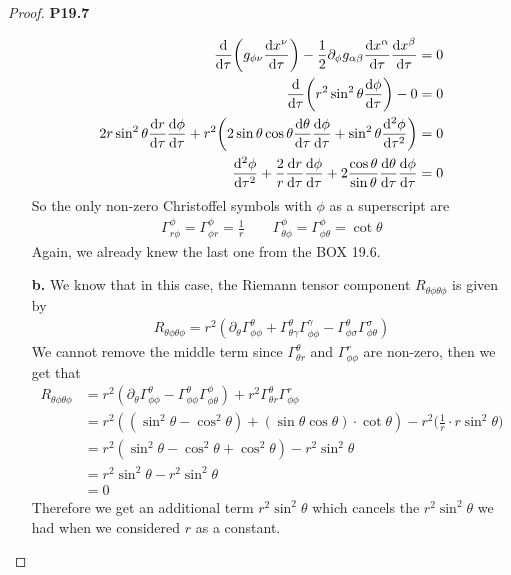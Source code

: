 \documentclass[11pt]{article}
\theoremstyle{definition}
\begin{document}
\begin{proof}{\textbf{P19.7}}
\begin{itemize}
\begin{align*}
    \dv{\tau}(g_{\phi\nu}\dv{x^{\nu}}{\tau})
    - \frac{1}{2}\partial_{\phi}
    g_{\alpha\beta}\dv{x^\alpha}{\tau}\dv{x^\beta}{\tau}
    &= 0\\
    \dv{\tau}(r^2\sin^2\theta\dv{\phi}{\tau})
    - 0 &= 0\\
    2r\sin^2\theta\dv{r}{\tau}\dv{\phi}{\tau}
    + r^2\bigg(2\sin\theta\cos\theta\dv{\theta}{\tau}\dv{\phi}{\tau}
    + \sin^2\theta\dv[2]{\phi}{\tau}\bigg)
    &= 0\\
    \dv[2]{\phi}{\tau}
    + \frac{2}{r}\dv{r}{\tau}\dv{\phi}{\tau}
    + 2\frac{\cos\theta}{\sin\theta}\dv{\theta}{\tau}\dv{\phi}{\tau}
    &= 0
\end{align*}
So the only non-zero Christoffel symbols with $\phi$ as a superscript are
\begin{align*}
    \Gamma^\phi_{r\phi} = \Gamma^\phi_{\phi r} = \frac{1}{r}
    \qquad
    \Gamma^\phi_{\theta\phi} = \Gamma^\phi_{\phi\theta} = \cot\theta
\end{align*}
Again, we already knew the last one from the BOX 19.6.

\item[\textbf{b.}]
We know that in this case, the Riemann tensor component
$R_{\theta\phi\theta\phi}$ is given by
\begin{align*}
    R_{\theta\phi\theta\phi} =
    r^2(\partial_\theta\Gamma^\theta_{\phi\phi}
    + \Gamma^\theta_{\theta\gamma}\Gamma^\gamma_{\phi\phi}
    - \Gamma^\theta_{\phi\sigma}\Gamma^\sigma_{\phi\theta})
\end{align*}
We cannot remove the middle term since
$\Gamma^\theta_{\theta r}$ and $\Gamma^r_{\phi\phi}$ are non-zero, then we get
that
\begin{align*}
    R_{\theta\phi\theta\phi} &=
    r^2(\partial_\theta\Gamma^\theta_{\phi\phi}
    - \Gamma^\theta_{\phi\phi}\Gamma^\phi_{\phi\theta})
    + r^2\Gamma^\theta_{\theta r}\Gamma^r_{\phi\phi}\\
    &= r^2((\sin^2\theta - \cos^2\theta)
    + (\sin\theta\cos\theta) \cdot \cot\theta)
    - r^2\bigg(\frac{1}{r}\cdot r\sin^2\theta\bigg)\\
    &= r^2(\sin^2\theta - \cos^2\theta + \cos^2\theta)
    - r^2\sin^2\theta\\
    &= r^2\sin^2\theta - r^2\sin^2\theta\\
    &= 0
\end{align*}
Therefore we get an additional term $r^2\sin^2\theta$ which cancels the 
$r^2\sin^2\theta$ we had when we considered $r$ as a constant.
\end{itemize}
\end{proof}
\end{document}
